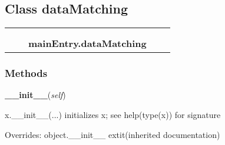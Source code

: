 
\subsection{Class dataMatching}

    \label{mainEntry:dataMatching}
\begin{tabular}{cccccc}
\multicolumn{2}{r}{\settowidth{\BCL}{object}\multirow{2}{\BCL}{object}}
&&
  \\\cline{3-3}
  &&\multicolumn{1}{c|}{}
&&
  \\
&&\multicolumn{2}{l}{\textbf{mainEntry.dataMatching}}
\end{tabular}



  \subsubsection{Methods}

    \vspace{0.5ex}

\hspace{.8\funcindent}\begin{boxedminipage}{\funcwidth}

    \raggedright \textbf{\_\_init\_\_}(\textit{self})

\setlength{\parskip}{2ex}
    x.\_\_init\_\_(...) initializes x; see help(type(x)) for signature

\setlength{\parskip}{1ex}
      Overrides: object.\_\_init\_\_ 	extit{(inherited documentation)}

    \end{boxedminipage}

    \label{mainEntry:dataMatching:readTsvDatabase}

    \vspace{0.5ex}

